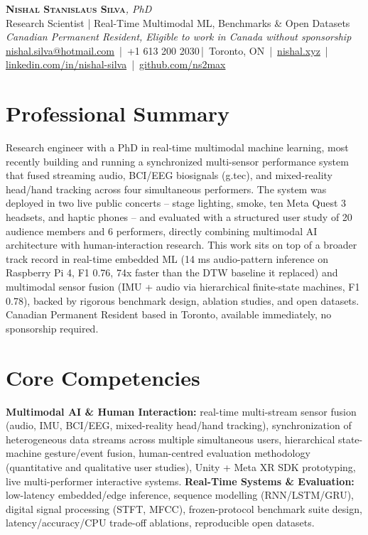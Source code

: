 \documentclass[11pt]{article}
\makeatletter
\newcommand{\cvName}{Nishal Stanislaus Silva}
\newcommand{\cvEmail}{nishal.silva@hotmail.com}
\newcommand{\cvPhone}{+1 613 200 2030}
\newcommand{\cvCity}{Toronto, ON}
\newcommand{\cvSite}{https://nishal.xyz}
\newcommand{\cvLinkedIn}{https://www.linkedin.com/in/nishal-silva}
\newcommand{\cvGitHub}{https://github.com/ns2max}
\newcommand{\cvStatus}{Canadian Permanent Resident, Eligible to work in Canada without sponsorship}
\newcommand{\cvTagline}{Research Scientist | Real-Time Multimodal ML, Benchmarks \& Open Datasets}
\makeatother
\begin{document}
\pagestyle{empty}
\begin{center}
    {\LARGE \scshape \textbf{\cvName}}{\large \textit{, PhD}}\\[1pt]
    {\small \cvTagline}\\[1pt]
    {\footnotesize\textit{\cvStatus}}\\[1pt]
    {\small
    \href{mailto:\cvEmail}{\cvEmail} \,|\, \cvPhone \,|\, \cvCity
    \,|\, \href{\cvSite}{nishal.xyz} \,|\, \href{\cvLinkedIn}{linkedin.com/in/nishal-silva}
    \,|\, \href{\cvGitHub}{github.com/ns2max}}
\end{center}

\section*{Professional Summary}
Research engineer with a PhD in real-time multimodal machine learning, most recently building and running a synchronized multi-sensor performance system that fused streaming audio, BCI/EEG biosignals (g.tec), and mixed-reality head/hand tracking across four simultaneous performers. The system was deployed in two live public concerts -- stage lighting, smoke, ten Meta Quest 3 headsets, and haptic phones -- and evaluated with a structured user study of 20 audience members and 6 performers, directly combining multimodal AI architecture with human-interaction research. This work sits on top of a broader track record in real-time embedded ML (14 ms audio-pattern inference on Raspberry Pi 4, F1 0.76, 74x faster than the DTW baseline it replaced) and multimodal sensor fusion (IMU + audio via hierarchical finite-state machines, F1 0.78), backed by rigorous benchmark design, ablation studies, and open datasets. Canadian Permanent Resident based in Toronto, available immediately, no sponsorship required.

\section*{Core Competencies}
\textbf{Multimodal AI \& Human Interaction:} real-time multi-stream sensor fusion (audio, IMU, BCI/EEG, mixed-reality head/hand tracking), synchronization of heterogeneous data streams across multiple simultaneous users, hierarchical state-machine gesture/event fusion, human-centred evaluation methodology (quantitative and qualitative user studies), Unity + Meta XR SDK prototyping, live multi-performer interactive systems. \textbf{Real-Time Systems \& Evaluation:} low-latency embedded/edge inference, sequence modelling (RNN/LSTM/GRU), digital signal processing (STFT, MFCC), frozen-protocol benchmark suite design, latency/accuracy/CPU trade-off ablations, reproducible open datasets.
\end{document}
